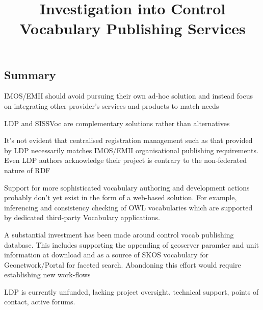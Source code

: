 \documentclass[10pt,a4paper]{article}
\title{Investigation into Control Vocabulary Publishing Services}
\date{}
\newenvironment{italicquotes}
{\begin{quote}\itshape}
{\end{quote}}
\let\Item\item
\newcommand\SpecialItem{\renewcommand\item[1][]{\Item[\textbullet~\bfseries##1]}}
\begin{document}
\SpecialItem

  \maketitle
    \begin{flushleft}
  \setlength{\parindent}{5ex}

% 
% 



\section{
	Summary
}

\item[] IMOS/EMII should avoid pursuing their own ad-hoc solution and instead focus on integrating other provider's services and products to match needs 
\item[] LDP and SISSVoc are complementary solutions rather than alternatives
\item[] It's not evident that centralised registration management such as that provided by LDP necessarily matches IMOS/EMII organisational publishing requirements. Even LDP authors acknowledge their project is contrary to the non-federated nature of RDF
\item[] Support for more sophisticated vocabulary authoring and development actions probably don't yet exist in the form of a web-based solution. For example, inferencing and consistency checking of OWL vocabularies which are supported by dedicated third-party Vocabulary applications.
\item[] A substantial investment has been made around control vocab publishing database. This includes supporting the appending of geoserver paramter and unit information at download and 
as a source of SKOS vocabulary for Geonetwork/Portal for faceted search. Abandoning this effort would require establishing new work-flows
\item[] LDP is currently unfunded, lacking project oversight, technical support, points of contact, active forums.




\end{flushleft}
\end{document}
